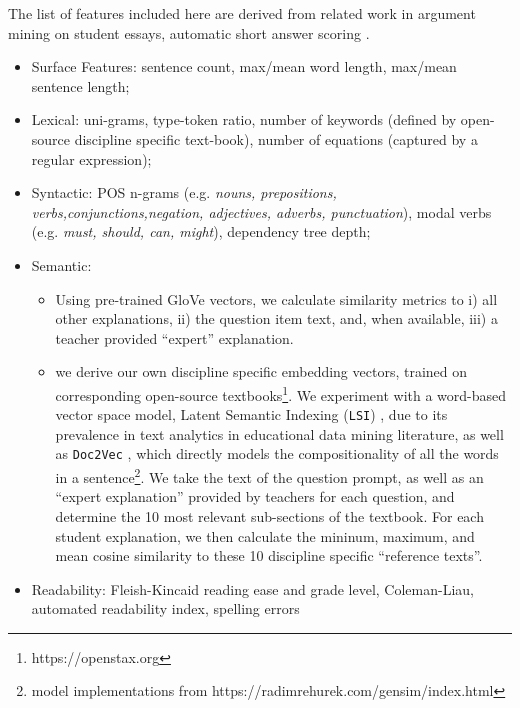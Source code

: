 \documentclass[notitlepage,12pt]{jedm}
\begin{document}
The list of features included here are derived from related work in argument 
mining \cite{habernal_which_2016}\cite{persing_end--end_2016} on student 
essays, automatic short answer scoring \cite{mohler_text--text_2009}.

\begin{itemize}
	
	\item Surface Features: 
	sentence count, 
	max/mean word length, 
	max/mean sentence length;
	
	\item Lexical: 
	uni-grams, 
	type-token ratio, 
	number of keywords (defined by open-source discipline specific 
	text-book), 
	number of equations (captured by a regular expression);
	
	\item Syntactic: 
	POS n-grams (e.g. \textit{nouns, prepositions, 
		verbs,conjunctions,negation, adjectives, adverbs, punctuation}), 
	modal verbs (e.g. \textit{must, should, can, might}),
	dependency tree depth;
	
	\item Semantic:
	\begin{itemize}
		\item Using pre-trained GloVe \cite{pennington_glove:_2014} vectors, we 
		calculate similarity metrics to i) all other explanations, ii) the 
		question item text, and, when available, iii) a teacher provided 
		``expert'' explanation.
		\item we derive our own discipline specific embedding vectors, trained 
		on corresponding open-source textbooks\footnote{https://openstax.org}. 
		We experiment with a word-based vector space model, Latent Semantic 
		Indexing (\verb|LSI|) \cite{deerwester_indexing_1990}, due to its 
		prevalence in text analytics in educational data mining literature, as 
		well as \verb|Doc2Vec| \cite{le_distributed_2014}, which directly 
		models the compositionality of all the words in a 
		sentence\footnote{model implementations from 
		https://radimrehurek.com/gensim/index.html}.
		We take the text of the question prompt, as well as an ``expert 
		explanation'' provided by teachers for each question, and determine the 
		10 most relevant sub-sections of the textbook.
		For each student explanation, we then calculate the mininum, maximum, 
		and mean cosine similarity to these 10 discipline specific ``reference 
		texts''.
		 
	\end{itemize}
		
	
	\item Readability:
	Fleish-Kincaid reading ease and grade level,
	Coleman-Liau,
	automated readability index, 
	spelling errors
	
\end{itemize}
\end{document}
